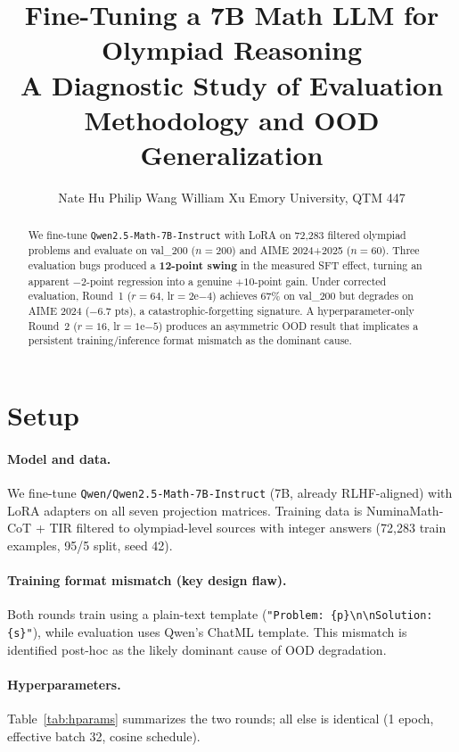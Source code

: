 \documentclass[10pt,twocolumn]{article}
\title{\textbf{Fine-Tuning a 7B Math LLM for Olympiad Reasoning}\\[2pt]
{\large A Diagnostic Study of Evaluation Methodology and OOD Generalization}}
\author{Nate Hu \quad Philip Wang \quad William Xu \quad Emory University, QTM 447}
\date{}
\begin{document}
\maketitle
\vspace{-1em}

\begin{abstract}
We fine-tune \texttt{Qwen2.5-Math-7B-Instruct} with LoRA on 72{,}283 filtered olympiad problems and evaluate on val\_200 ($n{=}200$) and AIME 2024+2025 ($n{=}60$). Three evaluation bugs produced a \textbf{12-point swing} in the measured SFT effect, turning an apparent $-2$-point regression into a genuine $+10$-point gain. Under corrected evaluation, Round~1 ($r{=}64$, lr$=2\text{e}{-4}$) achieves 67\% on val\_200 but degrades on AIME 2024 ($-6.7$ pts), a catastrophic-forgetting signature. A hyperparameter-only Round~2 ($r{=}16$, lr$=1\text{e}{-5}$) produces an asymmetric OOD result that implicates a persistent training/inference format mismatch as the dominant cause.
\end{abstract}

\section{Setup}

\paragraph{Model and data.} We fine-tune \texttt{Qwen/Qwen2.5-Math-7B-Instruct} \cite{yang2024qwen25mathtechnicalreportmathematical} (7B, already RLHF-aligned) with LoRA \cite{hu2021loralowrankadaptationlarge} adapters on all seven projection matrices. Training data is NuminaMath-CoT + TIR \cite{numina_math_datasets} filtered to olympiad-level sources with integer answers (72{,}283 train examples, 95/5 split, seed 42).

\paragraph{Training format mismatch (key design flaw).} Both rounds train using a plain-text template (\texttt{"Problem: \{p\}\textbackslash n\textbackslash nSolution: \{s\}"}), while evaluation uses Qwen's ChatML template. This mismatch is identified post-hoc as the likely dominant cause of OOD degradation.

\paragraph{Hyperparameters.} Table~\ref{tab:hparams} summarizes the two rounds; all else is identical (1 epoch, effective batch 32, cosine schedule).
\end{document}
